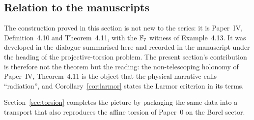 \subsection{Relation to the \AEG{} manuscripts}

The construction proved in this section is not new to the \AEG{} series: it is
Paper~IV, Definition~4.10 and Theorem~4.11, with the $\mathbb{F}_7$ witness of
Example~4.13.  It was developed in the dialogue summarised here and recorded in
the manuscript under the heading of the projective-torsion problem.  The present
section's contribution is therefore not the theorem but the reading: the
non-telescoping holonomy of Paper~IV, Theorem~4.11 is the \AEG{} object
that the physical narrative calls ``radiation'', and
Corollary~\ref{cor:larmor} states the Larmor criterion in its terms.

Section~\ref{sec:torsion} completes the picture by packaging the same data into a
transport that also reproduces the affine torsion of Paper~0 on the Borel
sector.
